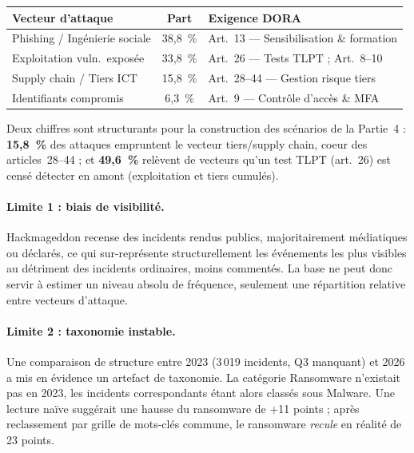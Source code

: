 \documentclass[11pt,a4paper]{article}
\theoremstyle{navystyle}
\theoremstyle{navydef}
\begin{document}
\begin{center}
\renewcommand{\arraystretch}{1.3}
\begin{tabular}{>{\raggedright}p{5cm} c >{\raggedright\arraybackslash}p{6cm}}
\toprule
\rowcolor{lightblue}
\textbf{Vecteur d'attaque} & \textbf{Part} & \textbf{Exigence DORA} \\
\midrule
Phishing / Ingénierie sociale & 38{,}8~\% & Art.~13 --- Sensibilisation \& formation \\
Exploitation vuln.\ exposée & 33{,}8~\% & Art.~26 --- Tests TLPT ; Art.~8--10 \\
Supply chain / Tiers ICT & 15{,}8~\% & Art.~28--44 --- Gestion risque tiers \\
Identifiants compromis & 6{,}3~\% & Art.~9 --- Contrôle d'accès \& MFA \\
\bottomrule
\end{tabular}
\end{center}

Deux chiffres sont structurants pour la construction des scénarios de la
Partie~4 : \textbf{15{,}8~\%} des attaques empruntent le vecteur tiers/supply
chain, coeur des articles~28--44 ; et \textbf{49{,}6~\%} relèvent de vecteurs
qu'un test TLPT (art.~26) est censé détecter en amont (exploitation et
tiers cumulés).

\paragraph{Limite 1 : biais de visibilité.} Hackmageddon recense des
incidents rendus publics, majoritairement médiatiques ou déclarés, ce qui
sur-représente structurellement les événements les plus visibles au détriment
des incidents ordinaires, moins commentés. La base ne peut donc servir à
estimer un niveau absolu de fréquence, seulement une répartition relative
entre vecteurs d'attaque.

\paragraph{Limite 2 : taxonomie instable.} Une comparaison de structure entre
2023 (3\,019 incidents, Q3 manquant) et 2026 a mis en évidence un artefact de
taxonomie. La catégorie \og Ransomware\fg{} n'existait pas en 2023, les incidents
correspondants étant alors classés sous \og Malware\fg{}. Une lecture naïve
suggérait une hausse du ransomware de +11 points ; après reclassement par
grille de mots-clés commune, le ransomware \emph{recule} en réalité de
23 points.
\end{document}

